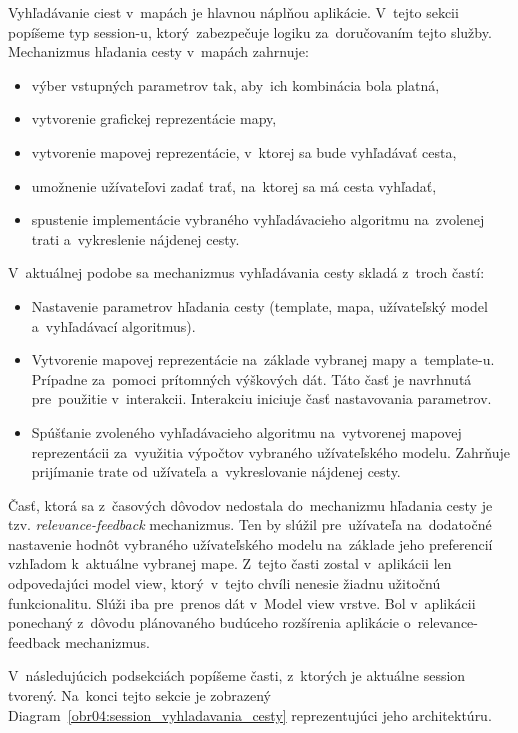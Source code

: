 Vyhľadávanie ciest v~mapách je hlavnou náplňou aplikácie. V~tejto sekcii popíšeme typ session-u, ktorý~zabezpečuje logiku za~doručovaním tejto služby. Mechanizmus hľadania cesty v~mapách zahrnuje:
\begin{itemize}
    \item výber vstupných parametrov tak, aby~ich kombinácia bola platná, 
    \item vytvorenie grafickej reprezentácie mapy,
    \item vytvorenie mapovej reprezentácie, v~ktorej sa bude vyhľadávať cesta,   
    \item umožnenie užívateľovi zadať trať, na~ktorej sa má cesta vyhľadať,
    \item spustenie implementácie vybraného vyhľadávacieho algoritmu na~zvolenej trati a~vykreslenie nájdenej cesty. 
\end{itemize} 
V~aktuálnej podobe sa mechanizmus vyhľadávania cesty skladá z~troch častí: 
\begin{itemize}
    \item Nastavenie parametrov hľadania cesty (template, mapa, užívateľský model a~vyhľadávací algoritmus).
    \item Vytvorenie mapovej reprezentácie na~základe vybranej mapy a~template-u. Prípadne za~pomoci prítomných výškových dát. Táto časť je navrhnutá pre~použitie v~interakcii. Interakciu iniciuje časť nastavovania parametrov. 
    \item Spúšťanie zvoleného vyhľadávacieho algoritmu na~vytvorenej mapovej reprezentácii za~využitia výpočtov vybraného užívateľského modelu. Zahrňuje prijímanie trate od užívateľa a~vykreslovanie nájdenej cesty.
\end{itemize} 

Časť, ktorá sa z~časových dôvodov nedostala do~mechanizmu hľadania cesty je tzv. \textit{relevance-feedback} mechanizmus. Ten by slúžil pre~užívateľa na~dodatočné nastavenie hodnôt vybraného užívateľského modelu na~základe jeho preferencií vzhľadom k~aktuálne vybranej mape. Z~tejto časti zostal v~aplikácii len odpovedajúci model view, ktorý~v~tejto chvíli nenesie žiadnu užitočnú funkcionalitu. Slúži iba pre~prenos dát v~Model view vrstve. Bol v~aplikácii ponechaný z~dôvodu plánovaného budúceho rozšírenia aplikácie o~relevance-feedback mechanizmus.

V~následujúcich podsekciách popíšeme časti, z~ktorých je aktuálne session tvorený. Na~konci tejto sekcie je zobrazený Diagram~\ref{obr04:session_vyhladavania_cesty} reprezentujúci jeho architektúru.

